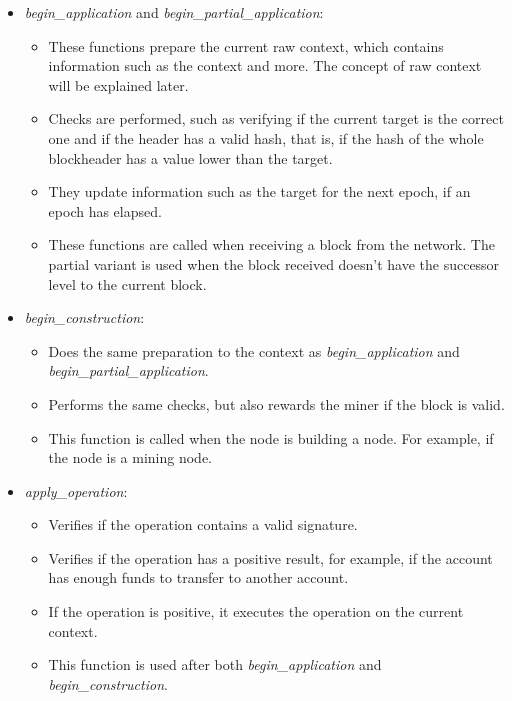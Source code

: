\begin{itemize}

    \item \emph{begin\_application} and \emph{begin\_partial\_application}:
        \begin{itemize}
            \item These functions prepare the current raw context, which contains information such as the context and more. The concept of raw context will be explained later.
            \item Checks are performed, such as verifying if the current target is the correct one and if the header has a valid hash, that is, if the hash of the whole blockheader has a value lower than the target.
            \item They update information such as the target for the next epoch, if an epoch has elapsed.
            \item These functions are called when receiving a block from the network. The partial variant is used when the block received doesn't have the successor level to the current block.
        \end{itemize}

    \item \emph{begin\_construction}:
        \begin{itemize}
            \item Does the same preparation to the context as \emph{begin\_application} and \emph{begin\_partial\_application}.
            \item Performs the same checks, but also rewards the miner if the block is valid.
            \item This function is called when the node is building a node. For example, if the node is a mining node.
        \end{itemize}

    \item \emph{apply\_operation}:
        \begin{itemize}
            \item Verifies if the operation contains a valid signature.
            \item Verifies if the operation has a positive result, for example, if the account has enough funds to transfer to another account.
            \item If the operation is positive, it executes the operation on the current context.
            \item This function is used after both \emph{begin\_application} and \emph{begin\_construction}.
        \end{itemize}


\end{itemize}
